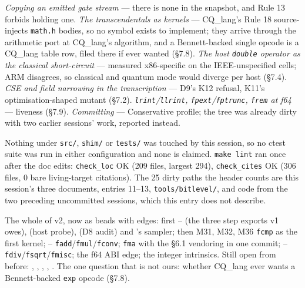 \emph{Copying an emitted gate stream} --- there is none in the snapshot, and Rule 13 forbids
holding one. \emph{The transcendentals as kernels} --- CQ\_lang's Rule 18 source-injects
\texttt{math.h} bodies, so no symbol exists to implement; they arrive through the arithmetic port
at CQ\_lang's algorithm, and a Bennett-backed single opcode is a CQ\_lang table row, filed there
if ever wanted (\S7.8). \emph{The host \texttt{double} operator as the classical short-circuit}
--- measured x86-specific on the IEEE-unspecified cells; ARM disagrees, so classical and quantum
mode would diverge per host (\S7.4). \emph{CSE and field narrowing in the transcription} --- D9's
K12 refusal, K11's optimisation-shaped mutant (\S7.2). \emph{\texttt{lrint}/\texttt{llrint},
\texttt{fpext}/\texttt{fptrunc}, \texttt{frem} at f64} --- liveness (\S7.9). \emph{Committing} ---
Conservative profile; the tree was already dirty with two earlier sessions' work, reported instead.

Nothing under \texttt{src/}, \texttt{shim/} or \texttt{tests/} was touched by this session, so no
ctest suite was run in either configuration and none is claimed. \texttt{make lint} ran once after
the doc edits: \texttt{check\_loc} OK (209 files, largest 294), \texttt{check\_cites} OK (306 files,
0 bare living-target citations). The 25 dirty paths the header counts are this session's three
documents, entries 11--13, \texttt{tools/bitlevel/}, and code from the two preceding uncommitted
sessions, which this entry does not describe.

The whole of v2, now as beads with edges: first -- (the three step exports
v1 owes),  (host probe),  (D8 audit) and 's sampler; then
 M31,  M32,  M36 \texttt{fcmp} as the first kernel;
-- \texttt{fadd}/\texttt{fmul}/\texttt{fconv}; 
\texttt{fma} with the \S6.1 vendoring in one commit; --
\texttt{fdiv}/\texttt{fsqrt}/\texttt{fmisc};  the f64 ABI edge;  the
integer intrinsics. Still open from before: , , , ,
. The one question that is not ours: whether CQ\_lang ever wants a Bennett-backed
\texttt{exp} opcode (\S7.8).

